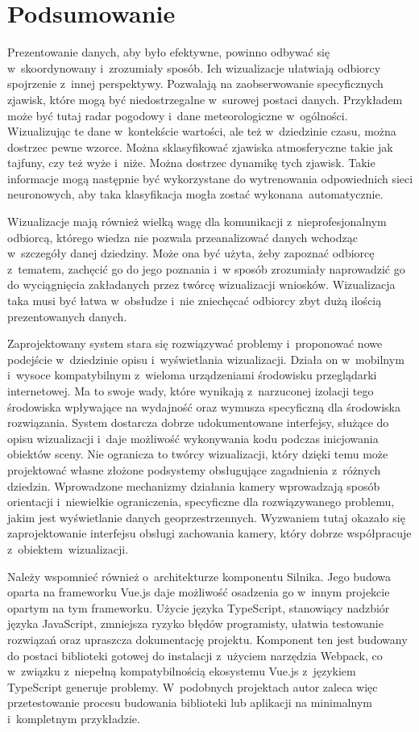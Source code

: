 \chapter{Podsumowanie}

Prezentowanie danych, aby było efektywne, powinno odbywać się w~skoordynowany i~zrozumiały sposób. Ich wizualizacje ułatwiają odbiorcy spojrzenie z~innej perspektywy. Pozwalają na zaobserwowanie specyficznych zjawisk, które mogą być niedostrzegalne w~surowej postaci danych. Przykładem może być tutaj radar pogodowy i~dane meteorologiczne w~ogólności. Wizualizując te dane w~kontekście wartości, ale też w~dziedzinie czasu, można dostrzec pewne wzorce. Można sklasyfikować zjawiska atmosferyczne takie jak tajfuny, czy też wyże i~niże. Można dostrzec dynamikę tych zjawisk. Takie informacje mogą następnie być wykorzystane do wytrenowania odpowiednich sieci neuronowych, aby taka klasyfikacja mogła zostać wykonana~automatycznie. 

Wizualizacje mają również wielką wagę dla komunikacji z~nieprofesjonalnym odbiorcą, którego wiedza nie pozwala przeanalizować danych wchodząc w~szczegóły danej dziedziny. Może ona być użyta, żeby zapoznać odbiorcę z~tematem, zachęcić go do jego poznania i~w sposób zrozumiały naprowadzić go do wyciągnięcia zakładanych przez twórcę wizualizacji wniosków. Wizualizacja taka musi być łatwa w~obsłudze i~nie zniechęcać odbiorcy zbyt dużą ilością prezentowanych danych.

Zaprojektowany system stara się rozwiązywać problemy i~proponować nowe podejście w~dziedzinie opisu i~wyświetlania wizualizacji. Działa on w~mobilnym i~wysoce kompatybilnym z~wieloma urządzeniami środowisku przeglądarki internetowej. Ma to swoje wady, które wynikają z~narzuconej izolacji tego środowiska wpływające na wydajność oraz wymusza specyficzną dla środowiska rozwiązania. System dostarcza dobrze udokumentowane interfejsy, służące do opisu wizualizacji i~daje możliwość wykonywania kodu podczas inicjowania obiektów sceny. Nie ogranicza to twórcy wizualizacji, który dzięki temu może projektować własne złożone podsystemy obsługujące zagadnienia z~różnych dziedzin. Wprowadzone mechanizmy działania kamery wprowadzają sposób orientacji i~niewielkie ograniczenia, specyficzne dla rozwiązywanego problemu, jakim jest wyświetlanie danych geoprzestrzennych. Wyzwaniem tutaj okazało się zaprojektowanie interfejsu obsługi zachowania kamery, który dobrze współpracuje z~obiektem~wizualizacji.

Należy wspomnieć również o~architekturze komponentu Silnika. Jego budowa oparta na frameworku Vue.js daje możliwość osadzenia go w~innym projekcie opartym na tym frameworku. Użycie języka TypeScript, stanowiący nadzbiór języka JavaScript, zmniejsza ryzyko błędów programisty, ułatwia testowanie rozwiązań oraz upraszcza dokumentację projektu. Komponent ten jest budowany do postaci biblioteki gotowej do instalacji z~użyciem narzędzia Webpack, co w~związku z~niepełną kompatybilnością ekosystemu Vue.js z~językiem TypeScript generuje problemy. W~podobnych projektach autor zaleca więc przetestowanie procesu budowania biblioteki lub aplikacji na minimalnym i~kompletnym przykładzie.

